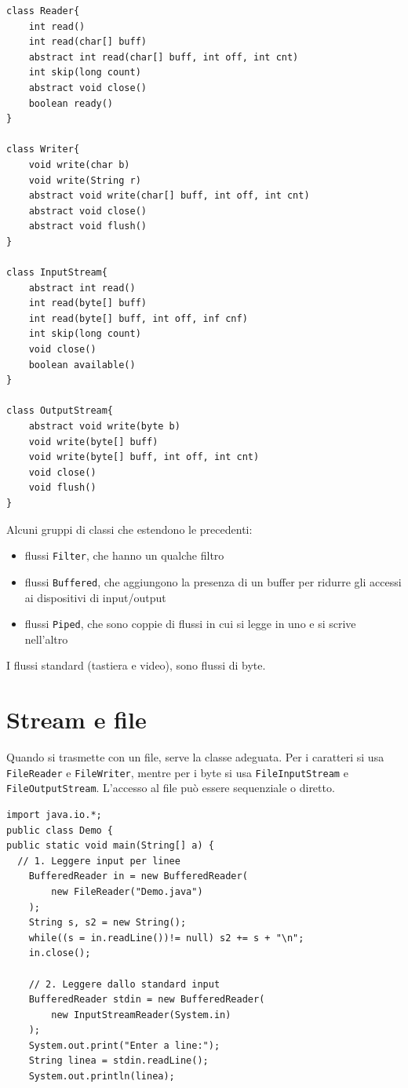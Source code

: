 \begin{lstlisting}
class Reader{
	int read()
	int read(char[] buff)
	abstract int read(char[] buff, int off, int cnt)
	int skip(long count)
	abstract void close()
	boolean ready()
}

class Writer{
	void write(char b)
	void write(String r)
	abstract void write(char[] buff, int off, int cnt)
	abstract void close()
	abstract void flush()
}

class InputStream{
	abstract int read()
	int read(byte[] buff)
	int read(byte[] buff, int off, inf cnf)
	int skip(long count)
	void close()
	boolean available()
}

class OutputStream{
	abstract void write(byte b)
	void write(byte[] buff)
	void write(byte[] buff, int off, int cnt)
	void close()
	void flush()
}
\end{lstlisting}
Alcuni gruppi di classi che estendono le precedenti:
\begin{itemize}
\item flussi \texttt{Filter}, che hanno un qualche filtro
\item flussi \texttt{Buffered}, che aggiungono la presenza di un buffer per ridurre gli accessi ai dispositivi di input/output
\item flussi \texttt{Piped}, che sono coppie di flussi in cui si legge in uno e si scrive nell'altro
\end{itemize}
I flussi standard (tastiera e video), sono flussi di byte.

\section{Stream e file}
Quando si trasmette con un file, serve la classe adeguata. Per i caratteri si usa \texttt{FileReader} e \texttt{FileWriter}, mentre per i byte si usa \texttt{FileInputStream} e \texttt{FileOutputStream}.
L'accesso al file può essere sequenziale o diretto.

\begin{lstlisting}
import java.io.*;
public class Demo {
public static void main(String[] a) {
  // 1. Leggere input per linee
	BufferedReader in = new BufferedReader(
		new FileReader("Demo.java")
	);
	String s, s2 = new String();
	while((s = in.readLine())!= null) s2 += s + "\n";
	in.close();

	// 2. Leggere dallo standard input
	BufferedReader stdin = new BufferedReader(
		new InputStreamReader(System.in)
	);
	System.out.print("Enter a line:");
	String linea = stdin.readLine();
	System.out.println(linea);
\end{lstlisting}

